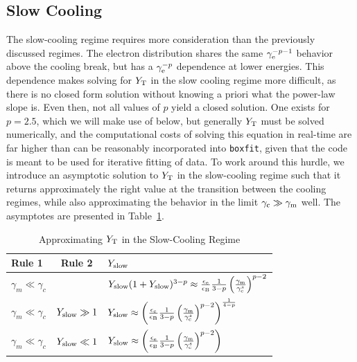 \documentclass[fleqn,usenatbib]{mnras}
\begin{document}
\subsection{Slow Cooling}
\indent The slow-cooling regime requires more consideration than the previously discussed regimes. The electron distribution shares the same $\gamma_{\rm e}^{-p-1}$ behavior above the cooling break, but has a $\gamma_{\rm e}^{-p}$ dependence at lower energies. This dependence makes solving for $Y_{\rm T}$ in the slow cooling regime more difficult, as there is no closed form solution without knowing a priori what the power-law slope is. Even then, not all values of $p$ yield a closed solution. One exists for $p=2.5$, which we will make use of below, but generally $Y_{\rm T}$ must be solved numerically, and the computational costs of solving this equation in real-time are far higher than can be reasonably incorporated into \texttt{boxfit}, given that the code is meant to be used for iterative fitting of data. To work around this hurdle, we introduce an asymptotic solution to $Y_{\rm T}$ in the slow-cooling regime such that it returns approximately the right value at the transition between the cooling regimes, while also approximating the behavior in the limit $\gamma_{\rm c}\gg\gamma_{\rm m}$ well. The asymptotes are presented in Table~\ref{tab:Yslow}. 


\begin{table}
\caption{Approximating $Y_{\rm T}$ in the Slow-Cooling Regime}
\label{tab:Yslow}
\begin{tabular}{lcl}
\hline
Rule 1 & Rule 2 & $Y_{\rm slow}$\\
\hline
$\gamma_{m} \ll \gamma_{c}$ & & $Y_{\rm slow}(1+Y_{\rm slow})^{3-p}  \approx \frac{\epsilon_{\rm e}}{\epsilon_{\rm B}}\frac{1}{3-p}\left(\frac{\gamma_{\rm m}}{\gamma_{\rm c}^s}\right)^{p-2}$ \\

$\gamma_{m} \ll \gamma_{c}$ & $Y_{\rm slow} \gg 1$ &$Y_{\rm slow} \approx \left(\frac{\epsilon_{\rm e}}{\epsilon_{\rm B}}\frac{1}{3-p}\left(\frac{\gamma_{\rm m}}{\gamma_{\rm c}^s}\right)^{p-2}\right)^{\frac{1}{4-p}}$ \\

$\gamma_{m} \ll \gamma_{c}$ & $Y_{\rm slow} \ll 1$ & $Y_{\rm slow} \approx \left(\frac{\epsilon_{\rm e}}{\epsilon_{\rm B}}\frac{1}{3-p}\left(\frac{\gamma_{\rm m}}{\gamma_{\rm c}^s}\right)^{p-2}\right)$\\
\hline
\end{tabular}
\end{table}
\end{document}
